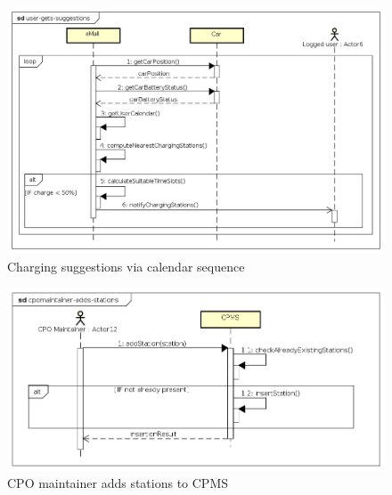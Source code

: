 \begin{figure}[!h]
    \begin{center}
        \includegraphics[keepaspectratio, width=16cm]{Sequence/user-gets-suggestions.png}
        \caption{Charging suggestions via calendar sequence}
    \end{center}
\end{figure}
\begin{figure}[!h]
    \begin{center}
        \includegraphics[keepaspectratio, width=16cm]{Sequence/cpomaintainer-adds-stations.png}
        \caption{\ac{CPO} maintainer adds stations to \ac{CPMS}}
    \end{center}
\end{figure}
